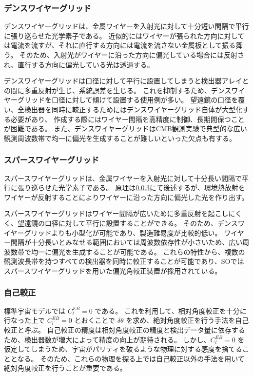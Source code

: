 \documentclass[../../main.tex]{subfiles}
\begin{document}
\subsubsection{デンスワイヤーグリッド}
デンスワイヤーグリッドは、金属ワイヤーを入射光に対して十分短い間隔で平行に張り巡らせた光学素子である。
近似的にはワイヤーが張られた方向に対しては電流を流すが、それに直行する方向には電流を流さない金属板として振る舞う。
そのため、入射光がワイヤーに沿った方向に偏光している場合には反射され、直行する方向に偏光している光は透過する。

デンスワイヤーグリッドは口径に対して平行に設置してしまうと検出器アレイとの間に多重反射が生じ、系統誤差を生じる。
これを抑制するため、デンスワイヤーグリッドを口径に対して傾けて設置する使用例が多い。
望遠鏡の口径を覆い、全検出器を同時に較正するためにはデンスワイヤーグリッド自体が大型化する必要があり、
作成する際にはワイヤー間隔を高精度に制御、長期間保つことが困難である。
また、デンスワイヤーグリッドはCMB観測実験で典型的な広い観測周波数帯で均一に偏光を生成することが難しいといった欠点も有する。

\subsubsection{スパースワイヤーグリッド}
スパースワイヤーグリッドは、金属ワイヤーを入射光に対して十分長い間隔で平行に張り巡らせた光学素子である。
原理は\ref{}にて後述するが、環境熱放射をワイヤーが反射することによりワイヤーに沿った方向に偏光した光を作り出す。

スパースワイヤーグリッドはワイヤー間隔が広いために多重反射を起こしにくく、望遠鏡の口径に対して平行に設置することができる。
そのため、デンスワイヤーグリッドよりも小型化が可能であり、製造難易度が比較的低い。
ワイヤー間隔が十分長いとみなせる範囲においては周波数依存性が小さいため、広い周波数帯で均一に偏光を生成することが可能である。
これらの特性から、複数の観測波長帯を持つすべての検出器を同時に較正することが可能であり、SOではスパースワイヤーグリッドを用いた偏光角較正装置が採用されている。

\subsubsection{自己較正}
標準宇宙モデルでは $C_{l}^{EB}=0$ である。
これを利用して、相対角度較正を十分に行なった上で $C_{l}^{EB} = 0$ とおくことで
$\delta\theta$ を求め、絶対角度較正を行う手法を自己較正と呼ぶ。
自己較正の精度は相対角度較正の精度と検出データ量に依存するため、検出器数が増大によって精度の向上が期待される。
しかし、$C_{l}^{EB}=0$ を仮定してしまうため、宇宙がパリティを破るような物理に対する感度を捨てることとなる。
そのため、これらの物理を探る上では自己較正以外の手法を用いて絶対角度較正を行うことが重要である。
\end{document}
